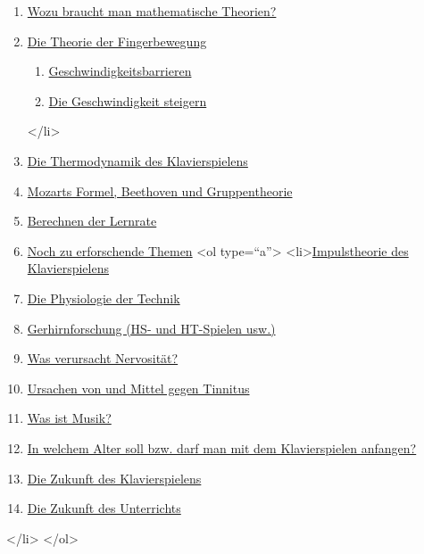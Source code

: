{\begin{enumerate} 
 \item \hyperref[c1iv1]{Wozu braucht man mathematische Theorien?}
 \item \hyperref[c1iv2]{Die Theorie der Fingerbewegung}
   \begin{enumerate}[label={\alph*.}] 
    <li>\hyperref[c1iv2a]{Serielles und paralleles Spielen}
    \item \hyperref[c1iv2b]{Geschwindigkeitsbarrieren}
    \item \hyperref[c1iv2c]{Die Geschwindigkeit steigern}
   \end{enumerate}
 </li>
 \item \hyperref[c1iv3]{Die Thermodynamik des Klavierspielens}
 \item \hyperref[c1iv4]{Mozarts Formel, Beethoven und Gruppentheorie}
 \item \hyperref[c1iv5]{Berechnen der Lernrate}
 \item \hyperref[c1iv6]{Noch zu erforschende Themen}
   <ol type=\enquote{a}>
    <li>\hyperref[c1iv6a]{Impulstheorie des Klavierspielens}
    \item \hyperref[c1iv6b]{Die Physiologie der Technik}
    \item \hyperref[c1iv6c]{Gerhirnforschung (HS- und HT-Spielen usw.)}
    \item \hyperref[c1iv6d]{Was verursacht Nervosität?}
    \item \hyperref[c1iv6e]{Ursachen von und Mittel gegen Tinnitus}
    \item \hyperref[c1iv6f]{Was ist Musik?}
    \item \hyperref[c1iv6g]{In welchem Alter soll bzw. darf man mit dem Klavierspielen anfangen?}
    \item \hyperref[c1iv6h]{Die Zukunft des Klavierspielens}
    \item \hyperref[c1iv6i]{Die Zukunft des Unterrichts}
    \end{enumerate}
 </li>
</ol>

}
